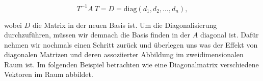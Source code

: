 \begin{equation*}
    T^{-1} A \ T = D = \text{diag}(d_1, d_2, \dots, d_n),
\end{equation*}

wobei \( D \) die Matrix in der neuen Basis ist. Um die Diagonalisierung durchzuführen, müssen wir demnach die Basis finden in der \( A \) diagonal ist. Dafür nehmen wir nochmals einen Schritt zurück und überlegen uns was der Effekt von diagonalen Matrizen und deren assoziierter Abbildung im zweidimensionalen Raum ist. Im folgenden Beispiel betrachten wie eine Diagonalmatrix verschiedene Vektoren im Raum abbildet.

\newpage

\begin{figure}[h]
    \centering

    \begin{tikzpicture}[x=0.75pt,y=0.75pt,yscale=-1,xscale=1]


\end{tikzpicture}
\end{figure}
